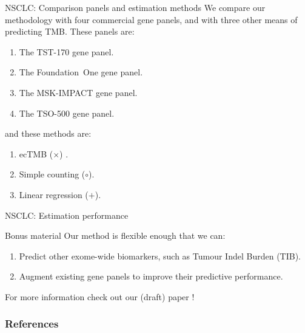 \documentclass{beamer}
\begin{document}
\begin{frame}{NSCLC: Comparison panels and estimation methods}
We compare our methodology with four commercial gene panels, and with three other means of predicting TMB. These panels are:
\begin{enumerate}
\item The \color{red} TST-170 \color{black} gene panel.
\item The \color{green} Foundation~One \color{black} gene panel.
\item The \color{blue} MSK-IMPACT \color{black} gene panel.
\item The \color{purple} TSO-500 \color{black} gene panel.
\end{enumerate}
and these methods are:
\begin{enumerate}
    \item ecTMB  ($\times$) \citep{yao_ectmb_2020}.
    \item Simple counting ($\circ$).
    \item Linear regression ($+$).
\end{enumerate}

\end{frame}




\begin{frame}{NSCLC: Estimation performance}


\end{frame}

\begin{frame}{Bonus material}
Our method is flexible enough that we can:
\begin{enumerate}
    \item Predict other exome-wide biomarkers, such as Tumour Indel Burden (TIB).
    \item Augment existing gene panels to improve their predictive performance.
\end{enumerate}
For more information check out our (draft) paper \cite{bradley_data-driven_2021}!
\end{frame}

\appendix
\begin{frame}[allowframebreaks]
        \frametitle{References}
        
\end{frame}
\end{document}
